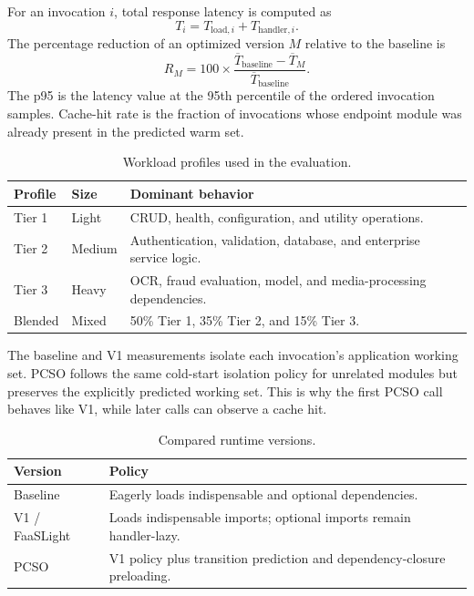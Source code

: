 \documentclass[12pt]{report}
\begin{document}
For an invocation $i$, total response latency is computed as
\begin{equation}
T_i=T_{\mathrm{load},i}+T_{\mathrm{handler},i}.
\end{equation}
The percentage reduction of an optimized version $M$ relative to the baseline is
\begin{equation}
R_M=100\times\frac{\overline{T}_{\mathrm{baseline}}-\overline{T}_M}
{\overline{T}_{\mathrm{baseline}}}.
\end{equation}
The p95 is the latency value at the 95th percentile of the ordered invocation samples. Cache-hit rate is the fraction of invocations whose endpoint module was already present in the predicted warm set.

\begin{table}[H]
\centering\small
\caption{Workload profiles used in the evaluation.}
\begin{tabularx}{\textwidth}{@{}l l X@{}}
\toprule
\textbf{Profile} & \textbf{Size} & \textbf{Dominant behavior}\\\midrule
Tier 1 & Light & CRUD, health, configuration, and utility operations.\\
Tier 2 & Medium & Authentication, validation, database, and enterprise service logic.\\
Tier 3 & Heavy & OCR, fraud evaluation, model, and media-processing dependencies.\\
Blended & Mixed & 50\% Tier 1, 35\% Tier 2, and 15\% Tier 3.\\
\bottomrule
\end{tabularx}
\end{table}

The baseline and V1 measurements isolate each invocation's application working set. PCSO follows the same cold-start isolation policy for unrelated modules but preserves the explicitly predicted working set. This is why the first PCSO call behaves like V1, while later calls can observe a cache hit.

\begin{table}[H]
\centering\small
\caption{Compared runtime versions.}
\begin{tabularx}{\textwidth}{@{}lX@{}}
\toprule
\textbf{Version} & \textbf{Policy}\\\midrule
Baseline & Eagerly loads indispensable and optional dependencies.\\
V1 / FaaSLight & Loads indispensable imports; optional imports remain handler-lazy.\\
PCSO & V1 policy plus transition prediction and dependency-closure preloading.\\
\bottomrule
\end{tabularx}
\end{table}
\end{document}

